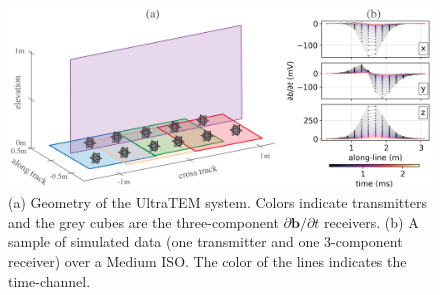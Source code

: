 \begin{figure}[htb]
\vspace{-0.1cm}
    \begin{center}
    \includegraphics[width=\columnwidth]{figures/ultratem-04.png}
    \end{center}
    \vspace{-0.5cm}
\caption{
    (a) Geometry of the UltraTEM system. Colors indicate transmitters
    and the grey cubes are the three-component $\partial \mathbf{b}/\partial t$ receivers.
    (b) A sample of simulated data (one transmitter and one 3-component receiver) over a Medium ISO. The color of the lines indicates the time-channel.
}
\label{fig:ultratem}
\vspace{-0.1cm}
\end{figure}
